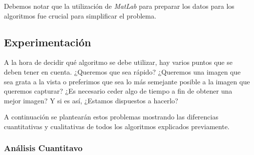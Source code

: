 Debemos notar que la utilización de \textit{MatLab} para preparar los datos para los algoritmos fue crucial para simplificar el problema.
	
\newpage
\subsection{Experimentación}

A la hora de decidir qué algoritmo se debe utilizar, hay varios puntos que se deben tener en cuenta. ¿Queremos que sea rápido? ¿Queremos una imagen que sea grata a la vista o preferimos que sea lo más semejante posible a la imagen que queremos capturar? ¿Es necesario ceder algo de tiempo a fin de obtener una mejor imagen? Y si es así, ¿Estamos dispuestos a hacerlo? 

\vspace{\baselineskip}

A continuación se plantearán estos problemas mostrando las diferencias cuantitativas y cualitativas de todos los algoritmos explicados previamente.

\subsubsection{Análisis Cuantitavo}

